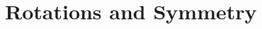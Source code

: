 % 
%





\chapterimage{\noheaderimage}

\chapter{Rotations and Symmetry\label{chap:RotationSymmetry}}

